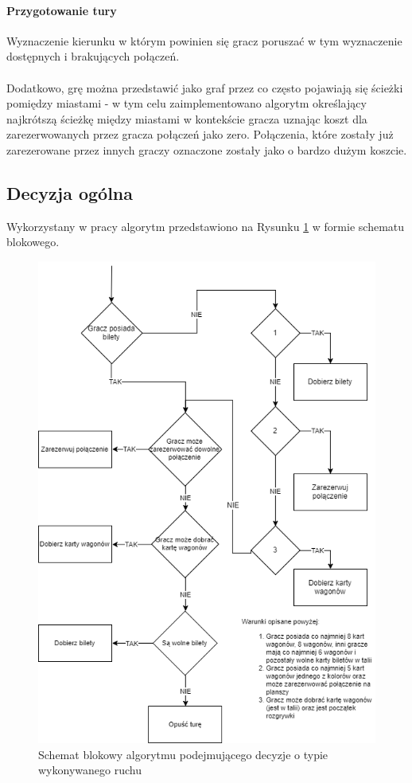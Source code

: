 \documentclass[12pt, oneside]{report}
\begin{document}
\paragraph{Przygotowanie tury} Wyznaczenie kierunku w którym powinien się gracz poruszać w tym wyznaczenie dostępnych i brakujących połączeń.
\\ \\
Dodatkowo, grę można przedstawić jako graf przez co często pojawiają się ścieżki pomiędzy miastami - w tym celu zaimplementowano algorytm określający najkrótszą ścieżkę między miastami w kontekście gracza uznając koszt dla zarezerwowanych przez gracza połączeń jako zero. Połączenia, które zostały już zarezerowane przez innych graczy oznaczone zostały jako o bardzo dużym koszcie.
\subsection{Decyzja ogólna}
Wykorzystany w pracy algorytm przedstawiono na Rysunku \ref{figure:alg_diagram} w formie schematu blokowego.
\begin{figure}
	\includegraphics[width=\textwidth]{MainAlgorithm2.png}
	\caption{Schemat blokowy algorytmu podejmującego decyzje o typie wykonywanego ruchu}
	\label{figure:alg_diagram}
\end{figure}
\end{document}
